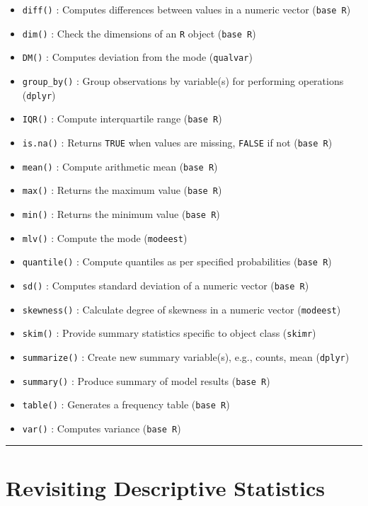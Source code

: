\documentclass[
]{book}
\providecommand{\tightlist}{%
  \setlength{\itemsep}{0pt}\setlength{\parskip}{0pt}}
\begin{document}
\begin{itemize}
\tightlist
\item
  \texttt{diff()} : Computes differences between values in a numeric vector (\texttt{base\ R})
\item
  \texttt{dim()} : Check the dimensions of an \texttt{R} object (\texttt{base\ R})
\item
  \texttt{DM()} : Computes deviation from the mode (\texttt{qualvar})
\item
  \texttt{group\_by()} : Group observations by variable(s) for performing operations (\texttt{dplyr})
\item
  \texttt{IQR()} : Compute interquartile range (\texttt{base\ R})
\item
  \texttt{is.na()} : Returns \texttt{TRUE} when values are missing, \texttt{FALSE} if not (\texttt{base\ R})
\item
  \texttt{mean()} : Compute arithmetic mean (\texttt{base\ R})
\item
  \texttt{max()} : Returns the maximum value (\texttt{base\ R})
\item
  \texttt{min()} : Returns the minimum value (\texttt{base\ R})
\item
  \texttt{mlv()} : Compute the mode (\texttt{modeest})
\item
  \texttt{quantile()} : Compute quantiles as per specified probabilities (\texttt{base\ R})
\item
  \texttt{sd()} : Computes standard deviation of a numeric vector (\texttt{base\ R})
\item
  \texttt{skewness()} : Calculate degree of skewness in a numeric vector (\texttt{modeest})
\item
  \texttt{skim()} : Provide summary statistics specific to object class (\texttt{skimr})
\item
  \texttt{summarize()} : Create new summary variable(s), e.g., counts, mean (\texttt{dplyr})
\item
  \texttt{summary()} : Produce summary of model results (\texttt{base\ R})
\item
  \texttt{table()} : Generates a frequency table (\texttt{base\ R})
\item
  \texttt{var()} : Computes variance (\texttt{base\ R})
\end{itemize}

\begin{center}\rule{0.5\linewidth}{0.5pt}\end{center}

\hypertarget{revisiting-descriptive-statistics}{%
\section{Revisiting Descriptive Statistics}\label{revisiting-descriptive-statistics}}
\end{document}
